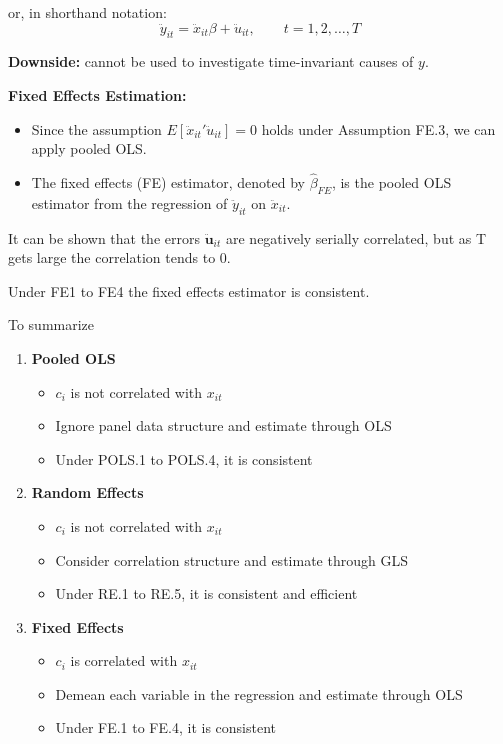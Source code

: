 or, in shorthand notation:
\[
\ddot{y}_{it} = \ddot{x}_{it} \beta + \ddot{u}_{it}, \qquad t = 1,2,\ldots,T
\tag{11}
\]

\textbf{Downside:} cannot be used to investigate time-invariant causes of $y$.

\medskip

\textbf{Fixed Effects Estimation:}
\begin{itemize}
    \item Since the assumption $E[\ddot{x}_{it}' \ddot{u}_{it}] = 0$ holds under Assumption FE.3, we can apply pooled OLS.
    \item The fixed effects (FE) estimator, denoted by $\hat{\beta}_{FE}$, is the pooled OLS estimator from the regression of $\ddot{y}_{it}$ on $\ddot{x}_{it}$.
\end{itemize}

It can be shown that the errors $\ddot{\textbf{u}}_{it}$ are negatively serially correlated, but as T gets large the correlation tends to 0. 

\vspace{10pt}

Under FE1 to FE4 the fixed effects estimator is consistent. 

\vspace{10pt}

To summarize

\begin{enumerate}

    \item \textbf{Pooled OLS}
    \begin{itemize}
        \item $c_i$ is not correlated with $x_{it}$
        \item Ignore panel data structure and estimate through OLS
        \item Under POLS.1 to POLS.4, it is consistent
    \end{itemize}

    \item \textbf{Random Effects}
    \begin{itemize}
        \item $c_i$ is not correlated with $x_{it}$
        \item Consider correlation structure and estimate through GLS
        \item Under RE.1 to RE.5, it is consistent and efficient
    \end{itemize}

    \item \textbf{Fixed Effects}
    \begin{itemize}
        \item $c_i$ is correlated with $x_{it}$
        \item Demean each variable in the regression and estimate through OLS
        \item Under FE.1 to FE.4, it is consistent
    \end{itemize}

\end{enumerate}




